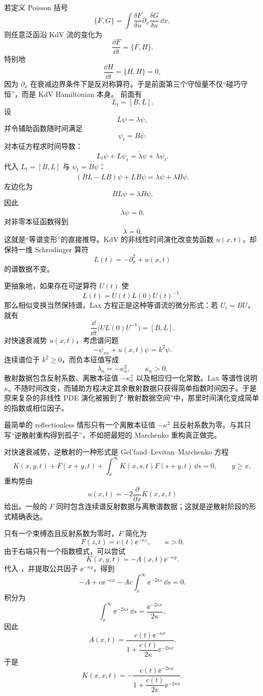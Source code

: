 若定义 Poisson 括号
\[
\{F,G\}
=\int\frac{\delta F}{\delta u}
\partial_x\frac{\delta G}{\delta u}\,\dd x,
\]
则任意泛函沿 KdV 流的变化为
\[
\frac{\dd F}{\dd t}=\{F,H\}.
\]
特别地
\[
\frac{\dd H}{\dd t}=\{H,H\}=0,
\]
因为 $\partial_x$ 在衰减边界条件下是反对称算符。于是前面第三个守恒量不仅“碰巧守恒”，而是 KdV Hamiltonian 本身。
前面有
\[
L_t=[B,L].
\]
设
\[
L\psi=\lambda\psi,
\]
并令辅助函数随时间满足
\[
\psi_t=B\psi.
\]
对本征方程求时间导数：
\[
L_t\psi+L\psi_t
=\dot\lambda\psi+\lambda\psi_t.
\]
代入 $L_t=[B,L]$ 与 $\psi_t=B\psi$：
\[
(BL-LB)\psi+LB\psi
=\dot\lambda\psi+\lambda B\psi.
\]
左边化为
\[
BL\psi=\lambda B\psi.
\]
因此
\[
\dot\lambda\psi=0.
\]
对非零本征函数得到
\begin{equation*}\boxed{\dot\lambda=0}.\end{equation*}
这就是“等谱变形”的直接推导。KdV 的非线性时间演化改变势函数 $u(x,t)$，却保持一维 Schrodinger 算符
\[
L(t)=-\partial_x^2+u(x,t)
\]
的谱数据不变。

更抽象地，如果存在可逆算符 $U(t)$ 使
\[
L(t)=U(t)L(0)U(t)^{-1},
\]
那么相似变换当然保持谱。Lax 方程正是这种等谱流的微分形式：若 $U_t=BU$，就有
\[
\frac{\dd}{\dd t}
\bigl(UL(0)U^{-1}\bigr)
=[B,L].
\]
对快速衰减势 $u(x,t)$，考虑谱问题
\[
-\psi_{xx}+u(x,t)\psi=k^2\psi.
\]
连续谱位于 $k^2\ge0$，而负本征值写成
\[
\lambda_n=-\kappa_n^2,
\qquad \kappa_n>0.
\]
散射数据包含反射系数、离散本征值 $-\kappa_n^2$ 以及相应归一化常数。Lax 等谱性说明 $\kappa_n$ 不随时间改变，而辅助方程决定其余散射数据只获得简单指数时间因子。于是原来复杂的非线性 PDE 演化被搬到了``散射数据空间''中，那里时间演化变成简单的指数或相位因子。

最简单的 reflectionless 情形只有一个离散本征值 $-\kappa^2$ 且反射系数为零。与其只写“逆散射重构得到孤子”，不如把最短的 Marchenko 重构真正做完。

对快速衰减势，逆散射的一种形式是 Gel'fand--Levitan--Marchenko 方程
\begin{equation}
K(x,y,t)+F(x+y,t)
+\int_x^\infty K(x,s,t)F(s+y,t)\,\dd s=0,
\qquad y\ge x,
\label{eq:glm-marchenko}
\end{equation}
重构势由
\begin{equation}
\boxed{
 u(x,t)=-2\frac{\partial}{\partial x}K(x,x,t)
}
\label{eq:marchenko-potential-reconstruction}
\end{equation}
给出。一般的 $F$ 同时包含连续谱反射数据与离散谱数据；这就是逆散射阶段的形式精确表达。

只有一个束缚态且反射系数为零时，$F$ 简化为
\[
F(z,t)=c(t)\ee^{-\kappa z},
\qquad \kappa>0.
\]
由于右端只有一个指数模式，可以尝试
\[
K(x,y,t)=-A(x,t)\ee^{-\kappa y}.
\]
代入 ，并提取公共因子 $\ee^{-\kappa y}$，得到
\[
-A+c\ee^{-\kappa x}
-Ac\int_x^\infty\ee^{-2\kappa s}\,\dd s=0.
\]
积分为
\[
\int_x^\infty\ee^{-2\kappa s}\,\dd s
=\frac{\ee^{-2\kappa x}}{2\kappa},
\]
因此
\[
A(x,t)
=\frac{c(t)\ee^{-\kappa x}}
{1+\dfrac{c(t)}{2\kappa}\ee^{-2\kappa x}}.
\]
于是
\begin{equation*}K(x,x,t)
=-\frac{c(t)\ee^{-2\kappa x}}
{1+\dfrac{c(t)}{2\kappa}\ee^{-2\kappa x}}.\end{equation*}

